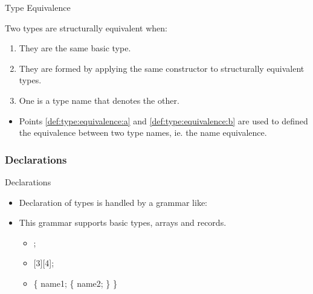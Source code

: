 \begin{bibunit}[apalike]
\begin{frame}[b]{Type Equivalence}
	\begin{footnotesize}
	\begin{definition}\small
		Two types are structurally equivalent when:
		\begin{enumerate}
		\item\label{def:type:equivalence:a}They are the same basic type.
		\item\label{def:type:equivalence:b}They are formed by applying the same constructor to structurally equivalent types.
		\item One is a type name that denotes the other.
		\end{enumerate}
	\end{definition}
	\begin{itemize}
	\item Points \ref{def:type:equivalence:a} and \ref{def:type:equivalence:b} are used to defined the equivalence between two type names, ie. the name equivalence.
	\end{itemize}
	\end{footnotesize}
\end{frame}

\subsubsection{Declarations}

\tableofcontentslide[sections={3-6},sectionstyle={show/shaded},subsectionstyle={show/shaded/hide},subsubsectionstyle={show/shaded/hide/hide}]

\begin{frame}{Declarations}
	\begin{itemize}
	\item Declaration of types is handled by a grammar like:
		\begin{center}
		\begin{bnf}[.6\linewidth]
		\p{  ::= $\epsilon$}
		\p{  ::= $\epsilon$}
		\end{bnf}
		\end{center}
	\item This grammar supports basic types, arrays and records.
		\begin{itemize}
		\item {};
		\item {};
		\item {} \{  name1;  \{  name2; \} \}
		\end{itemize}
	\end{itemize}
\end{frame}


\end{bibunit}

